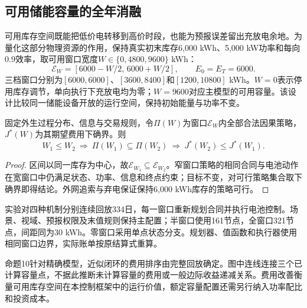 \subsection{可用储能容量的全年消融}\label{sec:capacity}
可用库存空间既能把低价电转移到高价时段，也能为预报误差留出充放电余地。为量化这部分物理资源的作用，保持真实初末库存6,000 kWh、5,000 kW功率和每向0.9效率，取可用窗口宽度$W\in\{0,4800,9600\}$ kWh：
\begin{equation}\label{eq:capacitywindow}
 \mathcal E_W=[6000-W/2,\,6000+W/2],\qquad E_0=E_T=6000.
\end{equation}
三档窗口分别为$[6000,6000]$、$[3600,8400]$和$[1200,10800]$ kWh。$W=0$表示停用库存调节，单向执行下充放电均为零；$W=9600$对应主模型的可用容量。该设计比较同一储能设备开放的运行空间，保持初始能量与功率不变。

固定外生过程分布、信息与交易规则，令$\Pi(W)$为窗口$\mathcal E_W$内全部合法因果策略，$J^*(W)$为其期望费用下确界。则
\begin{equation}\label{eq:capacitynesting}
 W_1\le W_2\ \Longrightarrow\ \Pi(W_1)\subseteq\Pi(W_2)
 \ \Longrightarrow\ J^*(W_2)\le J^*(W_1).
\end{equation}
\begin{proof}
区间以同一库存为中心，故$\mathcal E_{W_1}\subseteq\mathcal E_{W_2}$。窄窗口策略的相同合同与电池动作在宽窗口中仍满足状态、功率、信息和终点约束；目标不变，对可行策略集合取下确界即得结论。外网追索与弃电保证保持6,000 kWh库存的策略可行。
\end{proof}

实验对四种机制分别连续回放334日，每一窗口重新规划合同并执行电池控制。场景、视域、预报权限及末值规则保持主配置；半窗口使用161节点，全窗口321节点，间距同为30 kWh。零窗口采用单点状态分支。规划器、值函数和执行器使用相同窗口边界，实际账单按原结算式重算。

命题10针对精确模型，近似闭环的费用排序由完整回放确定。图中连线连接三个已计算容量点，不据此推断未计算容量的费用或一般边际收益递减关系。费用改善衡量可用库存空间在本控制框架中的运行价值，额定容量配置还需另行纳入功率配比和投资成本。
